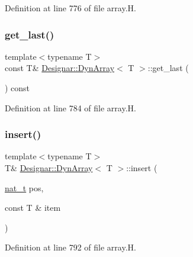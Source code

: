Definition at line 776 of file array.\+H.

\mbox{\label{class_designar_1_1_dyn_array_a45db099e907ae4ed4398cfea487bb4d7}} 
\subsubsection{\texorpdfstring{get\+\_\+last()}{get\_last()}\hspace{0.1cm}{\footnotesize\ttfamily [2/2]}}
{\footnotesize\ttfamily template$<$typename T$>$ \\
const T\& \hyperlink{class_designar_1_1_dyn_array}{Designar\+::\+Dyn\+Array}$<$ T $>$\+::get\+\_\+last (\begin{DoxyParamCaption}{ }\end{DoxyParamCaption}) const\hspace{0.3cm}{\ttfamily [inline]}}



Definition at line 784 of file array.\+H.

\mbox{\label{class_designar_1_1_dyn_array_a480d65a0b64bc30d26806cdbd07e66f1}} 
\subsubsection{\texorpdfstring{insert()}{insert()}\hspace{0.1cm}{\footnotesize\ttfamily [1/4]}}
{\footnotesize\ttfamily template$<$typename T$>$ \\
T\& \hyperlink{class_designar_1_1_dyn_array}{Designar\+::\+Dyn\+Array}$<$ T $>$\+::insert (\begin{DoxyParamCaption}\item[{\hyperlink{namespace_designar_aa72662848b9f4815e7bf31a7cf3e33d1}{nat\+\_\+t}}]{pos,  }\item[{const T \&}]{item }\end{DoxyParamCaption})\hspace{0.3cm}{\ttfamily [inline]}}



Definition at line 792 of file array.\+H.

